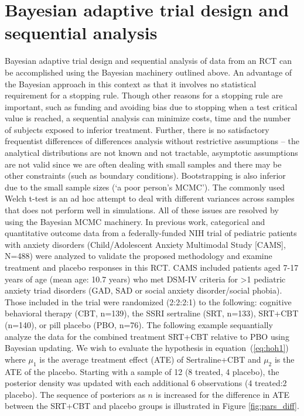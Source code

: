 \documentclass{juliacon}
\begin{document}
\section{Bayesian adaptive trial design and sequential analysis}
Bayesian adaptive trial design and sequential analysis of data from an RCT can be accomplished using the Bayesian machinery outlined above. An advantage of the Bayesian approach in this context as that it involves no statistical requirement for a stopping rule.  Though other reasons for a stopping rule are important, such as funding and avoiding bias due to stopping when a test critical value is reached, a sequential analysis can minimize costs, time and the number of subjects exposed to inferior treatment.  Further, there is no satisfactory frequentist differences of differences analysis without restrictive assumptions – the analytical distributions are not known and not tractable, asymptotic assumptions are not valid since we are often dealing with small samples and there may be other constraints (such as boundary conditions). Bootstrapping is also inferior due to the small sample sizes (‘a poor person’s MCMC’). The commonly used Welch t-test is an ad hoc attempt to deal with different variances across samples that does not perform well in simulations.\cite{Mills2019}  All of these issues are resolved by using the Bayesian MCMC machinery.
\vskip 6pt
In previous work,\cite{Strawn2018,Mills2019} categorical and quantitative outcome data from a federally-funded NIH trial of pediatric patients with anxiety disorders (Child/Adolescent Anxiety Multimodal Study [CAMS], N=488) were analyzed to validate the proposed methodology and examine treatment and placebo responses in this RCT. CAMS included patients aged 7-17 years of age (mean age: 10.7 years) who met DSM-IV criteria for >1 pediatric anxiety triad disorders (GAD, SAD or social anxiety disorder/social phobia). Those included in the trial were randomized (2:2:2:1) to the following: cognitive behavioral therapy (CBT, n=139), the SSRI sertraline (SRT, n=133), SRT+CBT (n=140), or pill placebo (PBO, n=76).
\vskip 6pt
The following example sequantially analyze the data for the combined treatment SRT+CBT relative to PBO using Bayesian updating.  We wish to evaluate the hypothesis in equation~(\ref{eq:hoh1}) where $\mu_1$ is the average treatment effect (ATE) of Sertraline+CBT and $\mu_2$ is the ATE of the placebo. Starting with a sample of 12 (8 treated, 4 placebo), the posterior density was updated with each additional 6 observations (4 treated:2 placebo).  The sequence of posteriors as $n$ is increased for the difference in ATE between the SRT+CBT and placebo groups is illustrated in Figure \ref{fig:pars_diff}.
\end{document}
